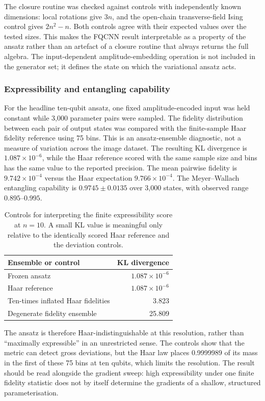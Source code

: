\documentclass[conference]{IEEEtran}
\begin{document}
The closure routine was checked against controls with independently known
dimensions: local rotations give $3n$, and the open-chain transverse-field
Ising control gives $2n^2-n$. Both controls agree with their expected values
over the tested sizes. This makes the FQCNN result interpretable as a property
of the ansatz rather than an artefact of a closure routine that always returns
the full algebra. The input-dependent amplitude-embedding operation is not
included in the generator set; it defines the state on which the variational
ansatz acts.

\subsubsection{Expressibility and entangling capability}
For the headline ten-qubit ansatz, one fixed amplitude-encoded input was held
constant while 3,000 parameter pairs were sampled. The fidelity distribution
between each pair of output states was compared with the finite-sample Haar
fidelity reference using 75 bins. This is an ansatz-ensemble diagnostic, not a
measure of variation across the image dataset. The resulting KL divergence is
$1.087\times10^{-6}$, while the Haar reference scored with the same sample size
and bins has the same value to the reported precision. The mean pairwise
fidelity is $9.742\times10^{-4}$ versus the Haar expectation
$9.766\times10^{-4}$. The Meyer--Wallach entangling capability is
$0.9745\pm0.0135$ over 3,000 states, with observed range $0.895$--$0.995$.

\begin{table}[!t]
\caption{Controls for interpreting the finite expressibility score at $n=10$. A small KL value is meaningful only relative to the identically scored Haar reference and the deviation controls.}
\label{tab:expressibility}
\centering
\small
\begin{tabular}{@{}lr@{}}
\toprule
\textbf{Ensemble or control} & \textbf{KL divergence} \\
\midrule
Frozen ansatz & $1.087\times10^{-6}$ \\
Haar reference & $1.087\times10^{-6}$ \\
Ten-times inflated Haar fidelities & 3.823 \\
Degenerate fidelity ensemble & 25.809 \\
\bottomrule
\end{tabular}
\end{table}

The ansatz is therefore Haar-indistinguishable at this resolution, rather than
``maximally expressible'' in an unrestricted sense. The controls show that the
metric can detect gross deviations, but the Haar law places 0.9999989 of its
mass in the first of these 75 bins at ten qubits, which limits the resolution.
The result should be read alongside the gradient sweep: high expressibility
under one finite fidelity statistic does not by itself determine the gradients
of a shallow, structured parameterisation.
\end{document}
